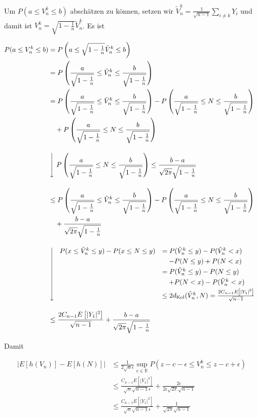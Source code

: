 Um $P(a\le V_n^k\le b)$ abschätzen zu können, setzen wir $\tilde V_n^k = \tfrac{1}{\sqrt{n-1}} \sum_{i\neq k} Y_i$ und damit ist $V_n^k = \sqrt{1-\tfrac 1n} \tilde V_n^k$. Es ist

\begin{align*}
P(a\le V_n^k\le b) &= P\left(a \le \sqrt{1-\tfrac 1n} \tilde V_n^k \le b\right) \\
&= P\left(\frac{a}{\sqrt{1-\tfrac 1n}} \le \tilde V_n^k \le \frac{b}{\sqrt{1-\tfrac 1n}}\right) \\
&= P\left(\frac{a}{\sqrt{1-\tfrac 1n}} \le \tilde V_n^k \le \frac{b}{\sqrt{1-\tfrac 1n}}\right)- P\left(\frac{a}{\sqrt{1-\tfrac 1n}} \le N \le \frac{b}{\sqrt{1-\tfrac 1n}}\right)\\
& \quad +P\left(\frac{a}{\sqrt{1-\tfrac 1n}} \le N \le \frac{b}{\sqrt{1-\tfrac 1n}}\right) \\[1em]
& \left\downarrow\ P\left(\frac{a}{\sqrt{1-\tfrac 1n}} \le N \le \frac{b}{\sqrt{1-\tfrac 1n}}\right) \le \frac{b-a}{\sqrt{2\pi}\sqrt{1-\tfrac 1n}}\right. \\[1em]
&\le P\left(\frac{a}{\sqrt{1-\tfrac 1n}} \le \tilde V_n^k \le \frac{b}{\sqrt{1-\tfrac 1n}}\right)- P\left(\frac{a}{\sqrt{1-\tfrac 1n}} \le N \le \frac{b}{\sqrt{1-\tfrac 1n}}\right)\\
& \quad +\frac{b-a}{\sqrt{2\pi}\sqrt{1-\tfrac 1n}} \\[1em]
&\left\downarrow\ \begin{array}{rl}
P(x \le \tilde V_n^k \le y) - P(x\le N \le y) & = P(\tilde V_n^k \le y) - P(\tilde V_n^k < x) \\[0.3em]
&\quad- P(N \le y) + P(N < x) \\[0.3em]
& = P(\tilde V_n^k \le y) - P(N \le y) \\[0.3em]
&\quad+ P(N < x) - P(\tilde V_n^k < x) \\[0.3em]
&\le 2 d_\text{Kol}(\tilde V_n^k, N)= \frac{2 C_{n-1} E\left[|Y_1|^3\right]}{\sqrt{n-1}}
\end{array} \right. \\[1em]
& \le \frac{2 C_{n-1} E\left[|Y_1|^3\right]}{\sqrt{n-1}}+\frac{b-a}{\sqrt{2\pi}\sqrt{1-\tfrac 1n}}
\end{align*}

\noindent Damit

\begin{align*}
\left|E\left[h(V_n)\right] - E\left[h(N)\right]\right| & \le \frac{1}{2\sqrt{n}\epsilon} \sup_{c\in\mathbb R} P\left(z-c-\epsilon \le V_n^k \le z-c+\epsilon\right) \\[1em]
& \le \frac{C_{n-1} E\left[|Y_1|^3\right]}{\sqrt n\sqrt{n-1}\epsilon}+\frac{2\epsilon}{2\epsilon\sqrt{2\pi}\sqrt{n-1}} \\
& \le \frac{C_{n-1} E\left[|Y_1|^3\right]}{\sqrt n\sqrt{n-1}\epsilon}+\frac{1}{\sqrt{2\pi}\sqrt{n-1}} \\
\end{align*}

